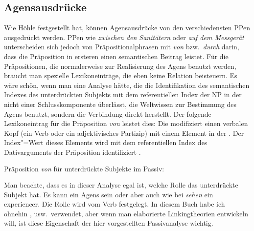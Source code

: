 {


\subsection{Agensausdrücke}
\label{sec-analyse-agensausdruecke}

Wie Höhle festgestellt hat, können Agensausdrücke von den verschiedensten PPen
ausgedrückt werden. PPen wie \emph{zwischen den Sanitätern} oder \emph{auf dem Messgerät}
unterscheiden sich jedoch von Präpositionalphrasen mit \emph{von} bzw.\ \emph{durch} darin,
dass die Präposition in ersteren einen semantischen Beitrag leistet. Für die Präpositionen,
die normalerweise zur Realisierung des Agens benutzt werden, braucht man spezielle
Lexikoneinträge, die eben keine Relation beisteuern. Es wäre schön, wenn man eine Analyse hätte,
die die Identifikation des semantischen Indexes des unterdrückten Subjekts mit dem referentiellen Index der NP in
der \vonpp nicht einer Schlusskomponente überlässt, die Weltwissen zur Bestimmung des Agens benutzt,
sondern die Verbindung direkt herstellt.
Der folgende Lexikoneintrag für die Präposition \emph{von} leistet dies:
Die \vonpp modifiziert einen verbalen Kopf (ein Verb oder ein adjektivisches Partizip) mit
einem Element in der \daliste. Der Index"=Wert dieses Elements wird mit dem referentiellen
Index des Dativarguments der Präposition identifiziert .

\eas
Präposition \emph{von} für unterdrückte Subjekte im Passiv:\\
\zs

\noindent
Man beachte, dass es in dieser Analyse egal ist, welche Rolle das unterdrückte Subjekt hat. Es kann
ein Agens sein oder aber auch wie bei \emph{sehen} ein experiencer. Die Rolle wird vom Verb
festgelegt. In diesem Buch habe ich ohnehin \argone, \argtwo usw.\ verwendet, aber wenn man
elaborierte Linkingtheorien entwickeln will, ist diese Eigenschaft der hier vorgestellten
Passivanalyse wichtig.

}
